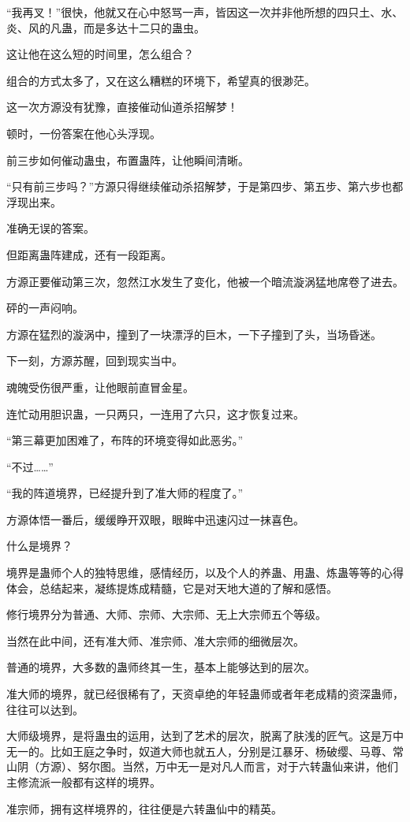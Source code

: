 \begin{this_body}
“我再叉！”很快，他就又在心中怒骂一声，皆因这一次并非他所想的四只土、水、炎、风的凡蛊，而是多达十二只的蛊虫。

这让他在这么短的时间里，怎么组合？

组合的方式太多了，又在这么糟糕的环境下，希望真的很渺茫。

这一次方源没有犹豫，直接催动仙道杀招解梦！

顿时，一份答案在他心头浮现。

前三步如何催动蛊虫，布置蛊阵，让他瞬间清晰。

“只有前三步吗？”方源只得继续催动杀招解梦，于是第四步、第五步、第六步也都浮现出来。

准确无误的答案。

但距离蛊阵建成，还有一段距离。

方源正要催动第三次，忽然江水发生了变化，他被一个暗流漩涡猛地席卷了进去。

砰的一声闷响。

方源在猛烈的漩涡中，撞到了一块漂浮的巨木，一下子撞到了头，当场昏迷。

下一刻，方源苏醒，回到现实当中。

魂魄受伤很严重，让他眼前直冒金星。

连忙动用胆识蛊，一只两只，一连用了六只，这才恢复过来。

“第三幕更加困难了，布阵的环境变得如此恶劣。”

“不过……”

“我的阵道境界，已经提升到了准大师的程度了。”

方源体悟一番后，缓缓睁开双眼，眼眸中迅速闪过一抹喜色。

什么是境界？

境界是蛊师个人的独特思维，感情经历，以及个人的养蛊、用蛊、炼蛊等等的心得体会，总结起来，凝练提炼成精髓，它是对天地大道的了解和感悟。

修行境界分为普通、大师、宗师、大宗师、无上大宗师五个等级。

当然在此中间，还有准大师、准宗师、准大宗师的细微层次。

普通的境界，大多数的蛊师终其一生，基本上能够达到的层次。

准大师的境界，就已经很稀有了，天资卓绝的年轻蛊师或者年老成精的资深蛊师，往往可以达到。

大师级境界，是将蛊虫的运用，达到了艺术的层次，脱离了肤浅的匠气。这是万中无一的。比如王庭之争时，奴道大师也就五人，分别是江暴牙、杨破缨、马尊、常山阴（方源）、努尔图。当然，万中无一是对凡人而言，对于六转蛊仙来讲，他们主修流派一般都有这样的境界。

准宗师，拥有这样境界的，往往便是六转蛊仙中的精英。


\end{this_body}
